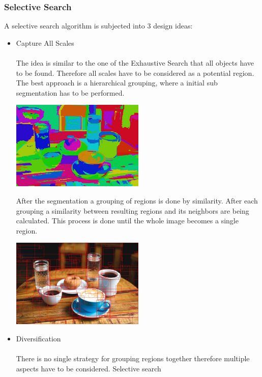 \subsubsection{Selective Search}
A selective search algorithm is subjected into 3 design ideas:
\begin{itemize}
    \item Capture All Scales \\ \\
        The idea is similar to the one of the Exhaustive Search that all objects have to be found. Therefore all scales have to be
        considered as a potential region. The best approach is a hierarchical grouping, where a initial sub segmentation has to
        be performed. \cite{selectivesearch}
        \begin{center}
            \includegraphics[width=0.5\textwidth]{images/breakfast_fnh.jpg}\cite{sssegmentationc}
        \end{center}
        After the segmentation a grouping of regions is done by similarity. After each grouping a similarity between
        resulting regions and its neighbors are being calculated. This process is done until the whole image becomes a single region.\cite{selectivesearch}
        \begin{center}
            \includegraphics[width=0.5\textwidth]{images/breakfast-top-200-proposals.jpg}\cite{sssegmentationbb}
        \end{center}
    \item Diversification \\ \\
        There is no single strategy for grouping regions together therefore multiple aspects have to be considered. Selective search

\end{itemize}
